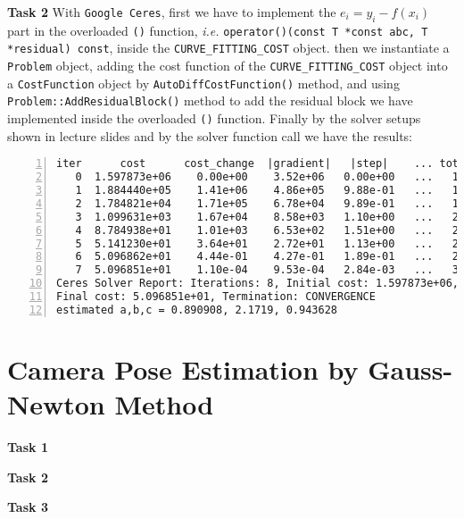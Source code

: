 \documentclass[12pt,a4paper]{article}
\begin{document}
    \textsf{\textbf{Task 2}}
    With \texttt{Google Ceres},
    first we have to implement the $e_i = y_i - f(x_i)$ part in
    the overloaded \texttt{()} function, \emph{i.e.}
    \texttt{operator()(const T *const abc, T *residual) const},
    inside the \texttt{CURVE\_FITTING\_COST} object.
    then we instantiate a \texttt{Problem} object,
    adding the cost function of the \texttt{CURVE\_FITTING\_COST} object
    into a \texttt{CostFunction} object
    by \texttt{AutoDiffCostFunction()} method,
    and using \texttt{Problem::AddResidualBlock()} method
    to add the residual block we have implemented inside
    the overloaded \texttt{()} function.
    Finally by the solver setups shown in lecture slides 
    and by the solver function call 
    we have the results:
    \begin{lstlisting}[frame=single,numbers=left]
iter      cost      cost_change  |gradient|   |step|    ... total_time
   0  1.597873e+06    0.00e+00    3.52e+06   0.00e+00   ...   1.17e-02
   1  1.884440e+05    1.41e+06    4.86e+05   9.88e-01   ...   1.66e-02
   2  1.784821e+04    1.71e+05    6.78e+04   9.89e-01   ...   1.99e-02
   3  1.099631e+03    1.67e+04    8.58e+03   1.10e+00   ...   2.29e-02
   4  8.784938e+01    1.01e+03    6.53e+02   1.51e+00   ...   2.58e-02
   5  5.141230e+01    3.64e+01    2.72e+01   1.13e+00   ...   2.79e-02
   6  5.096862e+01    4.44e-01    4.27e-01   1.89e-01   ...   2.98e-02
   7  5.096851e+01    1.10e-04    9.53e-04   2.84e-03   ...   3.17e-02
Ceres Solver Report: Iterations: 8, Initial cost: 1.597873e+06, 
Final cost: 5.096851e+01, Termination: CONVERGENCE
estimated a,b,c = 0.890908, 2.1719, 0.943628
    \end{lstlisting}

    \section{Camera Pose Estimation by Gauss-Newton Method}
    \textsf{\textbf{Task 1}}

    \textsf{\textbf{Task 2}}

    \textsf{\textbf{Task 3}}

    
\end{document}
